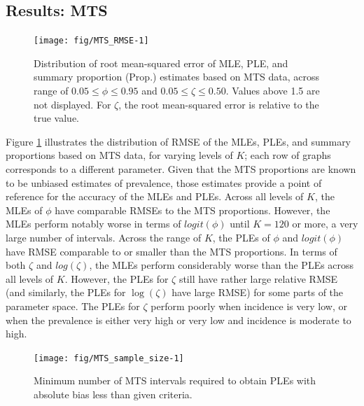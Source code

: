 \documentclass[man, noextraspace, floatsintext]{apa6}\usepackage[]{graphicx}\usepackage[]{color}
\newenvironment{knitrout}{}{} %
\begin{document}
\subsection{Results: MTS}

\begin{knitrout}
\color{fgcolor}\begin{figure}[tb]

{\centering \texttt{[image: fig/MTS\_RMSE-1]} 

}

\caption[Distribution of root mean-squared error of MLE, PLE, and summary proportion (Prop]{Distribution of root mean-squared error of MLE, PLE, and summary proportion (Prop.) estimates based on MTS data, across range of $0.05 \leq \phi \leq 0.95$ and $0.05 \leq \zeta \leq 0.50$. Values above 1.5 are not displayed. For $\zeta$, the root mean-squared error is relative to the true value.}\label{fig:MTS_RMSE}
\end{figure}


\end{knitrout}

Figure \ref{fig:MTS_RMSE} illustrates the distribution of RMSE of the MLEs, PLEs, and summary proportions based on MTS data, for varying levels of $K$; each row of graphs corresponds to a different parameter. 
Given that the MTS proportions are known to be unbiased estimates of prevalence, those estimates provide a point of reference for the accuracy of the MLEs and PLEs. 
Across all levels of $K$, the MLEs of $\phi$ have comparable RMSEs to the MTS proportions. 
However, the MLEs perform notably worse in terms of $logit(\phi)$ until $K = 120$ or more, a very large number of intervals.
Across the range of $K$, the PLEs of $\phi$ and $logit(\phi)$ have RMSE comparable to or smaller than the MTS proportions. 
In terms of both $\zeta$ and $log(\zeta)$, the MLEs perform considerably worse than the PLEs across all levels of $K$. 
However, the PLEs for $\zeta$ still have rather large relative RMSE (and similarly, the PLEs for $\log(\zeta)$ have large RMSE) for some parts of the parameter space. The PLEs for $\zeta$ perform poorly when incidence is very low, or when the prevalence is either very high or very low and incidence is moderate to high.

\begin{knitrout}
\color{fgcolor}\begin{figure}[tb]

{\centering \texttt{[image: fig/MTS\_sample\_size-1]} 

}

\caption[Minimum number of MTS intervals required to obtain PLEs with absolute bias less than given criteria]{Minimum number of MTS intervals required to obtain PLEs with absolute bias less than given criteria.}\label{fig:MTS_sample_size}
\end{figure}


\end{knitrout}
\end{document}
